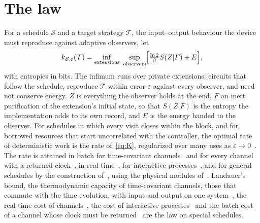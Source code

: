 \documentclass[11pt]{article}
\begin{document}
\section*{The law}
For a schedule $\mathcal S$ and a target strategy $\mathcal T$, the input--output behaviour the device must reproduce against adaptive observers, let
\begin{equation}\label{eq:K}
k_{\mathcal S,\varepsilon}(\mathcal T)=\inf_{\text{extensions}}\ \sup_{\text{observers}}\Bigl[\tfrac{\ln2}\beta S(Z|F)+E\Bigr],
\end{equation}
with entropies in bits. The infimum runs over private extensions: circuits that follow the schedule, reproduce $\mathcal T$ within error $\varepsilon$ against every observer, and need not conserve energy. $Z$ is everything the observer holds at the end, $F$ an inert purification of the extension's initial state, so that $S(Z|F)$ is the entropy the implementation adds to its own record, and $E$ is the energy handed to the observer. For schedules in which every visit closes within the block, and for borrowed resources that start uncorrelated with the controller, the optimal rate of deterministic work is the rate of~\eqref{eq:K}, regularized over many uses as $\varepsilon\to0$~\cite[Thm.~1]{Order}. The rate is attained in batch for time-covariant channels~\cite{FBB21} and for every channel with a returned clock~\cite{KeepingTime}, in real time~\cite{SaveWork}, for interactive processes~\cite{Answering}, and for general schedules by the construction of~\cite{Order}, using the physical modules of~\cite{Answering}. Landauer's bound, the thermodynamic capacity of time-covariant channels, those that commute with the time evolution, with input and output on one system~\cite{FBB19,FBB21}, the real-time cost of channels~\cite{SaveWork}, the cost of interactive processes~\cite{Answering} and the batch cost of a channel whose clock must be returned~\cite{KeepingTime} are the law on special schedules.
\end{document}
